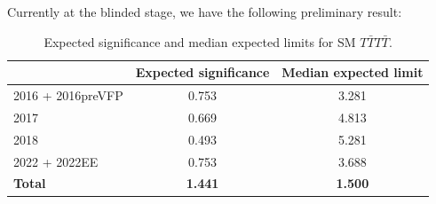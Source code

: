 \documentclass[twoside]{article}
\begin{document}
Currently at the blinded stage, we have the following preliminary result:\\

\begin{table}[h!]
    \centering
    \begin{tabular}{lcc}
        \toprule
        & \textbf{Expected significance} & \textbf{Median expected limit} \\
        \midrule
        2016 + 2016preVFP & 0.753 & 3.281 \\
        2017              & 0.669 & 4.813 \\
        2018              & 0.493 & 5.281 \\
        2022 + 2022EE     & 0.753 & 3.688 \\
        \midrule
        \textbf{Total}    & \textbf{1.441} & \textbf{1.500} \\
        \bottomrule
    \end{tabular}
    \caption{Expected significance and median expected limits for SM $T\bar{T}T\bar{T}$.}
    \label{tab:combine_res_blineded_sm}
\end{table}
\end{document}
